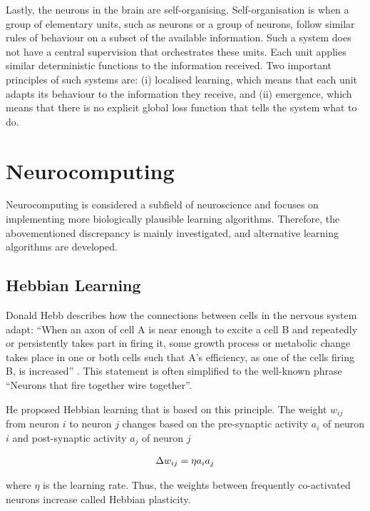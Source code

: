 Lastly, the neurons in the brain are self-organising.
Self-organisation is when a group of elementary units, such as neurons or a group of neurons, follow similar rules of behaviour on a subset of the available information.
Such a system does not have a central supervision that orchestrates these units.
Each unit applies similar deterministic functions to the information received.
Two important principles of such systems are: (i) localised learning, which means that each unit adapts its behaviour to the information they receive, and (ii) emergence, which means that there is no explicit global loss function that tells the system what to do.


\section{Neurocomputing}
Neurocomputing is considered a subfield of neuroscience and focuses on implementing more biologically plausible learning algorithms. Therefore, the abovementioned discrepancy is mainly investigated, and alternative learning algorithms are developed.

\subsection{Hebbian Learning}
Donald Hebb describes how the connections between cells in the nervous system adapt: ``When an axon of cell A is near enough to excite a cell B and repeatedly or persistently takes part in firing it, some growth process or metabolic change takes place in one or both cells such that A's efficiency, as one of the cells firing B, is increased'' . This statement is often simplified to the well-known phrase ``Neurons that fire together wire together''.

He proposed Hebbian learning that is based on this principle.
The weight $w_{ij}$ from neuron $i$ to neuron $j$ changes based on the pre-synaptic activity $a_i$ of neuron $i$ and post-synaptic activity $a_j$ of neuron $j$

\begin{align}\eqlbl{hebb_1}
	\Delta w_{ij} = \eta a_i a_j
\end{align}

where \(\eta\) is the learning rate.
Thus, the weights between frequently co-activated neurons increase called Hebbian plasticity.

